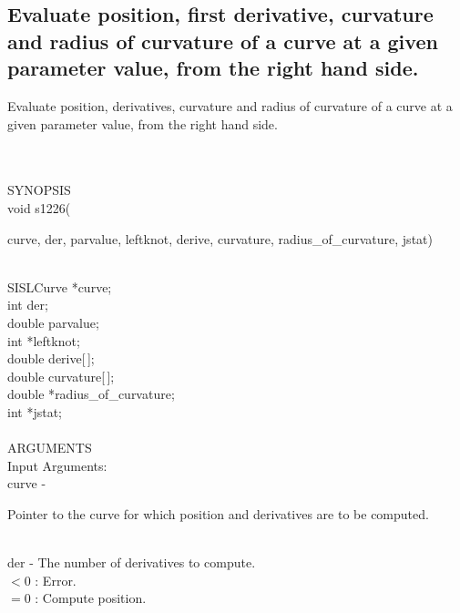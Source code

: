 \subsection{Evaluate position, first derivative, curvature and radius of
               curvature of a curve at a given parameter value, from the
               right hand side.}
\begin{minipg1}
Evaluate position, derivatives, curvature and radius of
               curvature of a curve at a given parameter value, from the
               right hand side.
\end{minipg1} \\ \\
SYNOPSIS\\
        \> void s1226(\begin{minipg3}
            {\fov curve}, {\fov der}, {\fov parvalue}, {\fov leftknot}, {\fov derive}, {\fov curvature},
	   radius\_of\_{\fov curvature}, {\fov jstat})
                \end{minipg3}\\
                \>\>    SISLCurve    \>  *{\fov curve};\\
                \>\>    int    \>  {\fov der};\\
                \>\>    double \> parvalue;\\
                \>\>    int    \>  *{\fov leftknot};\\
                \>\>    double \> derive[\,];\\
                \>\>    double \> curvature[\,];\\
                \>\>    double \>*{\fov radius}\_of\_curvature;\\
                \>\>    int    \>  *{\fov jstat};\\
\\
ARGUMENTS\\
	\>Input Arguments:\\
        \>\>    {\fov curve}\> - \>  \begin{minipg2}
                     Pointer to the curve for which position
                       and derivatives are to be computed.
                               \end{minipg2}\\
        \>\>    {\fov der}\> - \> The number of derivatives to compute.\\
	            \>\>\>\>\>       $< 0$ : Error.\\
		    \>\>\>\>\>       $= 0$ : Compute position.\\
